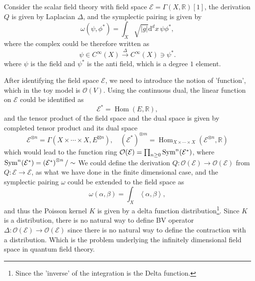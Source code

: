 \documentclass[10pt]{article}
\newcommand{\Hom}{\operatorname{Hom}}
\begin{document}
\begin{example}
  Consider the scalar field theory with field space $ \mathcal{E} = \Gamma(X, \mathbb{R})[1]$, the derivation $ Q$ is given by Laplacian $\Delta $, and the symplectic pairing is given by
  \begin{equation*}
    \omega(\psi, \phi^{*}) = \int _{X} \sqrt{\left| g \right|} \mathrm{d} ^{d} x \, \psi \phi^{*},
  \end{equation*}
  where the complex could be therefore written as
  \begin{equation*}
    \psi \in C^{\infty }(X) \xrightarrow{~\Delta~} C^{\infty }(X) \ni \psi^{*}.
  \end{equation*}
  where $ \psi$ is the field and $ \psi^{*}$ is the anti field, which is a degree $1$ element.
\end{example}

After identifying the field space $ \mathcal{E}$, we need to introduce the notion of 'function', which in the toy model is $ \mathcal{O}(V)$. Using the continuous dual, the linear function on $ \mathcal{E}$ could be identified as
\begin{equation*}
  \mathcal{E}^{*} = \Hom(E, \mathbb{R}),
\end{equation*}
and the tensor product of the field space and the dual space is given by completed tensor product and its dual space
\begin{equation*}
  \mathcal{E}^{\otimes n} = \Gamma(X \times \cdots \times X, E^{\boxtimes n}) , \quad \left( \mathcal{E}^{*} \right)^{\otimes m} = \Hom_{X \times \cdots \times X} \left( \mathcal{E}^{\otimes n}, \mathbb{R} \right)
\end{equation*}
which would lead to the function ring $ \mathcal{O}(\mathcal{E}) = \prod_{n \ge 0} \operatorname{Sym}^{n}(\mathcal{E}^{*})$, where $\operatorname{Sym}^{n}(\mathcal{E}^{*}) = \left( \mathcal{E}^{*} \right)^{\otimes n} / \sim$
We could define the derivation $ Q : \mathcal{O}(\mathcal{E}) \rightarrow \mathcal{O}(\mathcal{E})$ from $ Q : \mathcal{E} \rightarrow \mathcal{E}$, as what we have done in the finite dimensional case, and the symplectic pairing $ \omega$ could be extended to the field space as
\begin{equation*}
  \omega(\alpha, \beta) = \int _{X} \left< \alpha, \beta \right>,
\end{equation*}
and thus the Poisson kernel $ K$ is given by a delta function distribution\footnote{Since the 'inverse' of the integration is the Delta function.}.
Since $ K $ is a distribution, there is no natural way to define BV operator $ \Delta : \mathcal{O}(\mathcal{E}) \rightarrow \mathcal{O}(\mathcal{E})$ since there is no natural way to define the contraction with a distribution.
Which is the problem underlying the infinitely dimensional field space in quantum field theory.
\end{document}
